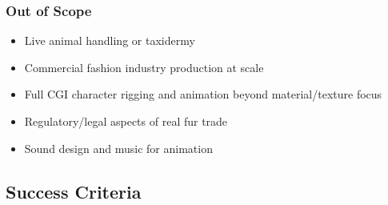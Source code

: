 \documentclass[11pt,letterpaper]{article}
\begin{document}
\subsubsection{Out of Scope}

\begin{itemize}[noitemsep]
  \item Live animal handling or taxidermy
  \item Commercial fashion industry production at scale
  \item Full CGI character rigging and animation beyond material/texture focus
  \item Regulatory/legal aspects of real fur trade
  \item Sound design and music for animation
\end{itemize}

\subsection{Success Criteria}
\end{document}
